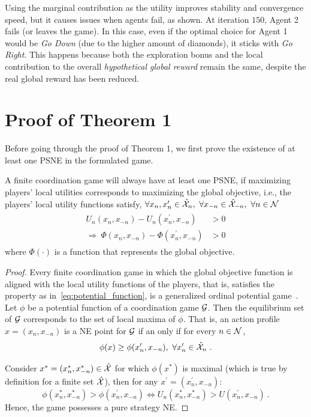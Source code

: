 Using the marginal contribution as the utility improves stability and convergence speed, but it causes issues when agents fail, as shown. At iteration $150$, Agent 2 fails (or leaves the game). In this case, even if the optimal choice for Agent 1 would be \emph{Go Down} (due to the higher amount of diamonds), it sticks with \emph{Go Right}. This happens because both the exploration bonus and the local contribution to the overall \emph{hypothetical global reward} remain the same, despite the real global reward has been reduced.

\section{Proof of Theorem 1}
\label{app:B}
Before going through the proof of Theorem 1, we first prove the existence of at least one PSNE in the formulated game.

\begin{lemma}\label{Existence_PSNE}
A finite coordination game will always have at least one PSNE, if maximizing players' local utilities corresponds to maximizing the global objective, i.e., the players' local utility functions satisfy, $\forall x_n, x^{\prime}_n\in\hat{\mathcal{X}}_n,\ \forall x_{-n}\in\hat{\mathcal{X}}_{-n},\ \forall n\in \mathcal{N}\,$
\begin{eqnarray}
\begin{aligned} \label{eq:potential_function}
    U_n(x_n,x_{-n})-U_n(x^{\prime}_n,x_{-n}) &> 0 \\
    \Rightarrow\ \Phi(x_n,x_{-n})-\Phi(x^{\prime}_n,x_{-n}) &> 0
\end{aligned}
\end{eqnarray}
\noindent where $\Phi(\cdot)$ is a function that represents the global objective.
\end{lemma}

\begin{proof}
Every finite coordination game in which the global objective function is aligned with the local utility functions of the players, that is, satisfies the property as in~\eqref{eq:potential_function}, is a generalized ordinal potential game~\citep{marden2009cooperative}.
Let $\phi$ be a potential function of a coordination game $\mathcal{G}$. Then the equilibrium set of $\mathcal{G}$ corresponds to the set of local maxima of $\phi$. That is, an action profile $x =(x_n,x_{-n})$ is a NE point for $\mathcal{G}$ if an only if for every $n\in\mathcal{N}$,
$$\phi(x) \geq \phi(x^{\prime}_n, x_{-n}),\ \forall x^{\prime}_n\in \hat{\mathcal{X}}_n \ .$$

Consider $x^*=(x_n^*,x_{-n}^*)\in\hat{\mathcal{X}}$ for which $\phi(x^*)$ is maximal (which is true by definition for a finite set $\hat{\mathcal{X}}$), then for any $x^{\prime}=(x_n^{\prime},x_{-n})$:
%
\begin{equation*}
\phi(x_n^*,x_{-n}^*) > \phi(x^{\prime}_n,x_{-n}) 
\Leftrightarrow U_n(x_n^*,x_{-n}^*) > U(x^{\prime}_n,x_{-n})\ .
\end{equation*}
%
Hence, the game possesses a pure strategy NE.
\end{proof}

